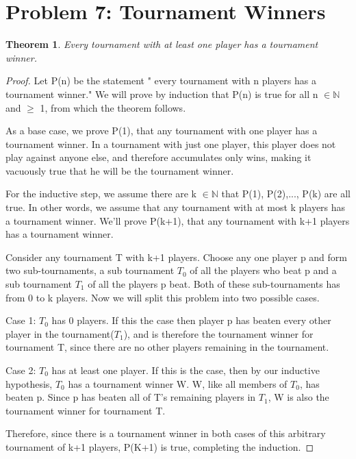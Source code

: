 \documentclass[10pt,letter]{article}
\newtheorem*{thm}{Theorem}
\begin{document}
\section*{Problem 7: Tournament Winners}
\begin{thm}
Every tournament with at least one player has a tournament winner. 
\end{thm}
\begin{proof}
Let P(n) be the statement " every tournament with n players has a tournament winner." We will prove by induction that P(n) is true for all n $\in \mathbb{N}$  and $\geq$ 1, from which the theorem follows.

As a base case, we prove P(1), that any tournament with one player has a tournament winner. In a tournament with just one player, this player does not play against anyone else, and therefore accumulates only wins, making it vacuously true that he will be the tournament winner. 

For the inductive step, we assume there are k  $\in \mathbb{N}$ that P(1), P(2),..., P(k) are all true. In other words, we assume that any tournament with at most k players has a tournament winner. We'll prove P(k+1), that any tournament with k+1 players has a tournament winner. 

Consider any tournament T with k+1 players. Choose any one player p and form two sub-tournaments, a sub tournament $T_0$ of all the players who beat p and a sub tournament $T_1$ of all the players p beat. Both of these sub-tournaments has from 0 to k players. Now we will split this problem into two possible cases. 

Case 1: $T_0$ has 0 players. If this the case then player p has beaten every other player in the tournament($T_1$), and is therefore the tournament winner for tournament T, since there are no other players remaining in the tournament.  

Case 2: $T_0$ has at least one player. If this is the case, then by our inductive hypothesis, $T_0$ has a tournament winner W. W, like all members of $T_0$, has beaten p. Since p has beaten all of T's remaining players in $T_1$, W is also the tournament winner for tournament T. 

Therefore, since there is a tournament winner in both cases of this arbitrary tournament of k+1 players, P(K+1) is true, completing the induction. 

\end{proof}


\end{document}

